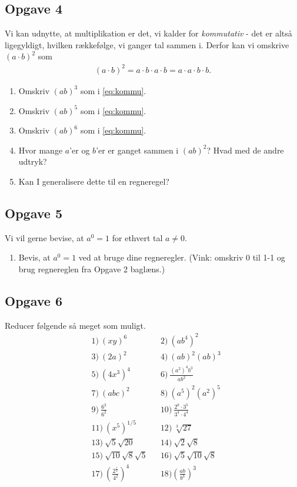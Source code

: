 \subsection*{Opgave 4}
Vi kan udnytte, at multiplikation er det, vi kalder for \textit{kommutativ} - det er altså ligegyldigt, hvilken rækkefølge, vi ganger tal sammen i. Derfor kan vi omskrive $(a\cdot b)^2$ som
\begin{align}\label{eq:kommu}
	(a\cdot b)^2 = a\cdot b \cdot a \cdot b = a\cdot a\cdot b \cdot b.
\end{align}
\begin{enumerate}[label=\roman*)]
	\item Omskriv $(ab)^3$ som i \eqref{eq:kommu}.
	\item Omskriv $(ab)^5$ som i \eqref{eq:kommu}.
	\item Omskriv $(ab)^6$ som i \eqref{eq:kommu}.
	\item Hvor mange $a$'er og $b$'er er ganget sammen i $(ab)^2$? Hvad med de andre udtryk?
	\item Kan I generalisere dette til en regneregel?
\end{enumerate}

\subsection*{Opgave 5}
Vi vil gerne bevise, at $a^0 = 1$ for ethvert tal $a \neq 0$. 
\begin{enumerate}[label=\roman*)]
	\item Bevis, at $a^0 = 1$ ved at bruge dine regneregler. (Vink: omskriv $0$ til 1-1 og brug regnereglen fra
	Opgave 2 baglæns.)
\end{enumerate}


\subsection*{Opgave 6}
Reducer følgende så meget som muligt. 
\begin{align*}
&1)\ (xy)^6   &&2)\ (ab^4)^2     \\
&3)\ (2a)^2   &&4)\  (ab)^2(ab)^3    \\
&5)\  (4x^3)^4             &&6)\ \frac{(a^2)^4b^3}{ab^2}\\
 &7)\ (abc)^2      &&8)\ (a^5)^2(a^2)^5\\
 &9)\ \frac{6^3}{6^2} &&10)\ \frac{2^8\cdot 3^5}{3^4\cdot 4^4}\\
 &11)\  (x^5)^{1/5}            &&12)\ \sqrt[3]{27}\\
 &13)\ \sqrt{5}\sqrt{20}      &&14)\ \sqrt{2}\sqrt{8}\\
 &15)\ \sqrt{10}\sqrt{8}\sqrt{5} &&16)\ \sqrt{5}\sqrt{10}\sqrt{8} \\
&17)\ \left(\frac{2^\frac{1}{2}}{4^2}\right)^4  &&18) \left(\frac{ab}{b^3}\right)^3
\end{align*}

